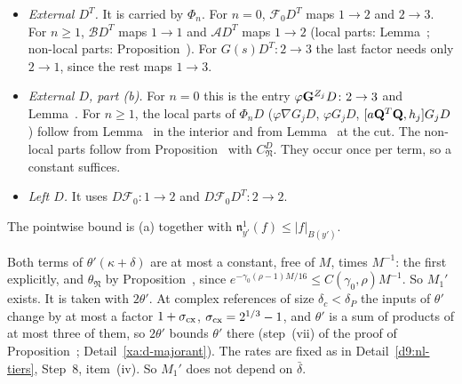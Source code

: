 \begin{detail}
\begin{step}
\[\]
\end{step}
\begin{step}
\begin{itemize}
\item \emph{External $D^T$.} It is carried by $\Phi_n$. For $n=0$, $\mathcal F_0D^T$ maps $1\to2$ and $2\to3$. For $n\ge1$, $\mathcal BD^T$ maps $1\to1$ and $\mathcal AD^T$ maps $1\to2$ (local parts: Lemma~; non-local parts: Proposition~). For $G(s)D^T\colon2\to3$ the last factor needs only $2\to1$, since the rest maps $1\to3$.
\item \emph{External $D$, part (b).} For $n=0$ this is the entry $\varphi\mathbf G^{Z_j}D\colon2\to3$ and Lemma~. For $n\ge1$, the local parts of $\Phi_nD$ ($\varphi\nabla G_jD$, $\varphi G_jD$, $[a\mathbf Q^T\mathbf Q,h_j]G_jD$) follow from Lemma~ in the interior and from Lemma~ at the cut. The non-local parts follow from Proposition~ with $C^D_{\mathfrak N}$. They occur once per term, so a constant suffices.
\item \emph{Left $D$.} It uses $D\mathcal F_0\colon1\to2$ and $D\mathcal F_0D^T\colon2\to2$.
\end{itemize}
The pointwise bound is (a) together with $\mathfrak n^1_{y'}(f)\le|f|_{B(y')}$.
\end{step}
\begin{step}[$M_1'$]
Both terms of $\theta'(\kappa+\delta)$ are at most a constant, free of $M$, times $M^{-1}$: the first explicitly, and $\theta_{\mathfrak N}$ by Proposition~, since $e^{-\gamma_0(\rho-1)M/16}\le C(\gamma_0,\rho)M^{-1}$. So $M_1'$ exists. It is taken with $2\theta'$. At complex references of size $\delta_c<\delta_P$ the inputs of $\theta'$ change by at most a factor $1+\sigma_{\rm cx}$, $\sigma_{\rm cx}=2^{1/3}-1$, and $\theta'$ is a sum of products of at most three of them, so $2\theta'$ bounds $\theta'$ there (step~(vii) of the proof of Proposition~; Detail~\ref{xa:d-majorant}). The rates are fixed as in Detail~\ref{d9:nl-tiers}, Step~8, item~(iv). So $M_1'$ does not depend on $\bar\delta$.
\end{step}
\end{detail}

